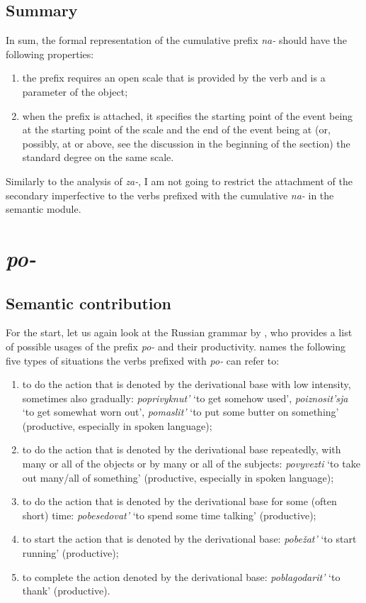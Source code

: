 \subsection{Summary} 
In sum, the formal representation of the cumulative prefix \textit{na-} should have the following properties: 
\begin{enumerate}
\item the prefix requires an open scale that is provided by the verb and is a parameter of the object;
\item when the prefix is attached, it specifies the starting point of the event being at the starting point of the scale and the end of the event being at (or, possibly, at or above, see the discussion in the beginning of the section) the standard degree on the same scale.
\end{enumerate}

Similarly to the analysis of \textit{za-}, I am not going to restrict the attachment of the secondary imperfective to the verbs prefixed with the cumulative \textit{na-} in the semantic module.

\section{\textit{po-}}\label{subsection:semantics:po}
\subsection{Semantic contribution} For the start, let us again look at the Russian grammar by \citet{Shvedova:82}, who provides a list of possible usages of the prefix \textit{po-} and their productivity. \citet[364--365]{Shvedova:82} names the following five types of situations the verbs prefixed with \textit{po-} can refer to:
\begin{enumerate}
\item to do the action that is denoted by the derivational base with low intensity, sometimes also gradually: \textit{poprivyknut'} `to get somehow used', \textit{poiznosit'sja} `to get somewhat worn out', \textit{pomaslit'} `to put some butter on something'  (productive, especially in spoken language);
\item to do the action that is denoted by the derivational base repeatedly, with many or all of the objects or by many or all of the subjects: \textit{povyvezti} `to take out many/all of something' (productive, especially in spoken language);
\item to do the action that is denoted by the derivational base for some (often short) time: \textit{pobesedovat'} `to spend some time talking' (productive);
\item to start the action that is denoted by the derivational base: \textit{pobe\v{z}at'} `to start running' (productive);
\item to complete the action denoted by the derivational base: \textit{poblagodarit'} `to thank' (productive).
\end{enumerate}

